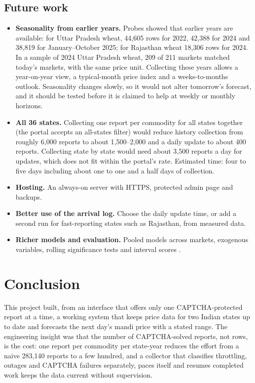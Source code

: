 \documentclass[12pt,a4paper,oneside]{report}
\numberwithin{equation}{chapter}
\numberwithin{figure}{chapter}
\numberwithin{table}{chapter}
\theoremstyle{definition}
\begin{document}
\section{Future work}
\begin{itemize}
  \item \textbf{Seasonality from earlier years.} Probes showed that earlier years are available: for Uttar Pradesh wheat, 44{,}605 rows for 2022, 42{,}388 for 2024 and 38{,}819 for January--October 2025; for Rajasthan wheat 18{,}306 rows for 2024. In a sample of 2024 Uttar Pradesh wheat, 209 of 211 markets matched today's markets, with the same price unit. Collecting these years allows a year-on-year view, a typical-month price index and a weeks-to-months outlook. Seasonality changes slowly, so it would not alter tomorrow's forecast, and it should be tested before it is claimed to help at weekly or monthly horizons.
  \item \textbf{All 36 states.} Collecting one report per commodity for all states together (the portal accepts an all-states filter) would reduce history collection from roughly 6{,}000 reports to about 1{,}500--2{,}000 and a daily update to about 400 reports. Collecting state by state would need about 3{,}500 reports a day for updates, which does not fit within the portal's rate. Estimated time: four to five days including about one to one and a half days of collection.
  \item \textbf{Hosting.} An always-on server with HTTPS, protected admin page and backups.
  \item \textbf{Better use of the arrival log.} Choose the daily update time, or add a second run for fast-reporting states such as Rajasthan, from measured data.
  \item \textbf{Richer models and evaluation.} Pooled models across markets, exogenous variables, rolling significance tests and interval scores \cite{gneiting2007}.
\end{itemize}

\chapter{Conclusion}
This project built, from an interface that offers only one CAPTCHA-protected report at a time, a working system that keeps price data for two Indian states up to date and forecasts the next day's mandi price with a stated range. The engineering insight was that the number of CAPTCHA-solved reports, not rows, is the cost: one report per commodity per state-year reduces the effort from a naive 283{,}140 reports to a few hundred, and a collector that classifies throttling, outages and CAPTCHA failures separately, paces itself and resumes completed work keeps the data current without supervision.
\end{document}
